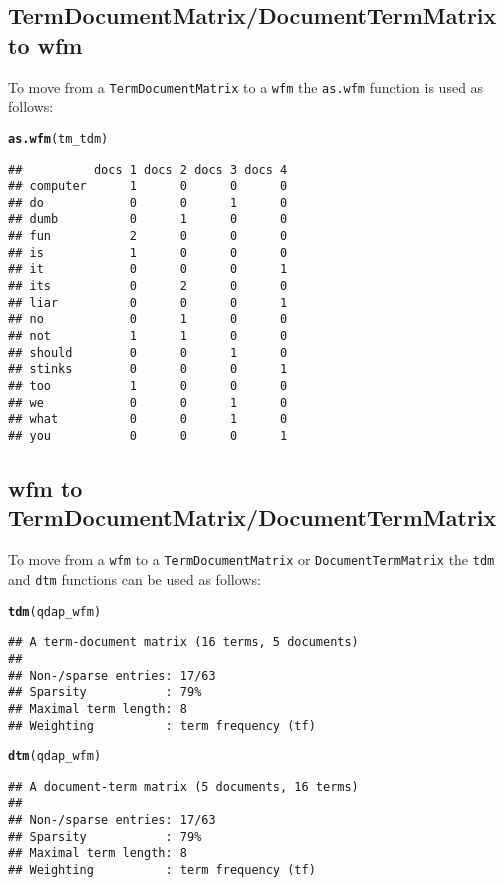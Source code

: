 \documentclass{article}\usepackage[]{graphicx}\usepackage[]{color}
\makeatletter
\newcommand{\hlstd}[1]{\textcolor[rgb]{0.345,0.345,0.345}{#1}}%
\newcommand{\hlkwd}[1]{\textcolor[rgb]{0.737,0.353,0.396}{\textbf{#1}}}%
\newenvironment{kframe}{%
 \def\at@end@of@kframe{}%
 \ifinner\ifhmode%
  \def\at@end@of@kframe{\end{minipage}}%
  \begin{minipage}{\columnwidth}%
 \fi\fi%
 \def\FrameCommand##1{\hskip\@totalleftmargin \hskip-\fboxsep
 \colorbox{shadecolor}{##1}\hskip-\fboxsep
     \hskip-\linewidth \hskip-\@totalleftmargin \hskip\columnwidth}%
 \MakeFramed {\advance\hsize-\width
   \@totalleftmargin\z@ \linewidth\hsize
   \@setminipage}}%
 {\par\unskip\endMakeFramed%
 \at@end@of@kframe}
\newenvironment{knitrout}{}{} %
\makeatother
\begin{document}
\subsection{TermDocumentMatrix/DocumentTermMatrix to wfm}

To move from a \texttt{TermDocumentMatrix} to a \texttt{wfm} the \texttt{as.wfm} function is used as follows:

\begin{knitrout}
\color{fgcolor}\begin{kframe}
\begin{alltt}
\hlkwd{as.wfm}\hlstd{(tm_tdm)}
\end{alltt}
\begin{verbatim}
##          docs 1 docs 2 docs 3 docs 4
## computer      1      0      0      0
## do            0      0      1      0
## dumb          0      1      0      0
## fun           2      0      0      0
## is            1      0      0      0
## it            0      0      0      1
## its           0      2      0      0
## liar          0      0      0      1
## no            0      1      0      0
## not           1      1      0      0
## should        0      0      1      0
## stinks        0      0      0      1
## too           1      0      0      0
## we            0      0      1      0
## what          0      0      1      0
## you           0      0      0      1
\end{verbatim}
\end{kframe}
\end{knitrout}


\subsection{wfm to TermDocumentMatrix/DocumentTermMatrix}

To move from a \texttt{wfm} to a \texttt{TermDocumentMatrix} or \texttt{DocumentTermMatrix} the \texttt{tdm} and \texttt{dtm} functions can be used as follows:

\begin{knitrout}
\color{fgcolor}\begin{kframe}
\begin{alltt}
\hlkwd{tdm}\hlstd{(qdap_wfm)}
\end{alltt}
\begin{verbatim}
## A term-document matrix (16 terms, 5 documents)
## 
## Non-/sparse entries: 17/63
## Sparsity           : 79%
## Maximal term length: 8 
## Weighting          : term frequency (tf)
\end{verbatim}
\begin{alltt}
\hlkwd{dtm}\hlstd{(qdap_wfm)}
\end{alltt}
\begin{verbatim}
## A document-term matrix (5 documents, 16 terms)
## 
## Non-/sparse entries: 17/63
## Sparsity           : 79%
## Maximal term length: 8 
## Weighting          : term frequency (tf)
\end{verbatim}
\end{kframe}
\end{knitrout}






\end{document}
